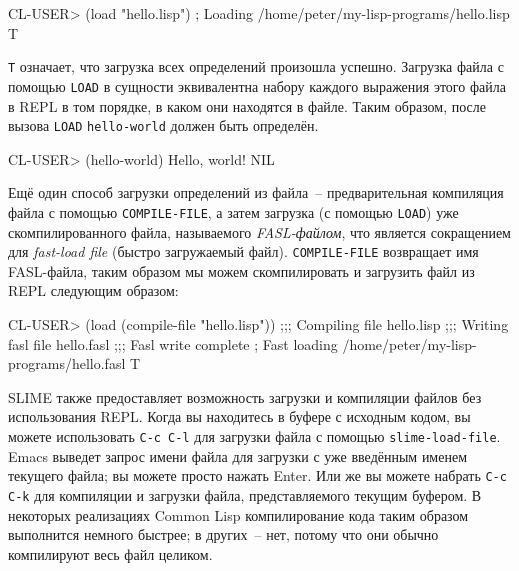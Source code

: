 \begin{myverb}
CL-USER> (load "hello.lisp")
; Loading /home/peter/my-lisp-programs/hello.lisp
T
\end{myverb}

\lstinline{T} означает, что загрузка всех определений произошла успешно. Загрузка файла с помощью \lstinline{LOAD} в сущности эквивалентна набору
каждого выражения этого файла в REPL в том порядке, в каком они находятся в файле. Таким
образом, после вызова \lstinline{LOAD} \lstinline{hello-world} должен быть определён.

\begin{myverb}
CL-USER> (hello-world)
Hello, world!
NIL
\end{myverb}

Ещё один способ загрузки определений из файла~-- предварительная компиляция файла с помощью
\lstinline{COMPILE-FILE}, а затем загрузка (с помощью \lstinline{LOAD}) уже скомпилированного файла, называемого
\emph{FASL-файлом}, что является сокращением для \emph{fast-load file} (быстро загружаемый
файл). \lstinline{COMPILE-FILE} возвращает имя FASL-файла, таким образом мы можем скомпилировать и
загрузить файл из REPL следующим образом:

\begin{myverb}
CL-USER> (load (compile-file "hello.lisp"))
;;; Compiling file hello.lisp
;;; Writing fasl file hello.fasl
;;; Fasl write complete
; Fast loading /home/peter/my-lisp-programs/hello.fasl
T
\end{myverb}

SLIME также предоставляет возможность загрузки и компиляции файлов без использования
REPL. Когда вы находитесь в буфере с исходным кодом, вы можете использовать \texttt{C-c C-l} для
загрузки файла с помощью \texttt{slime-load-file}. Emacs выведет запрос имени файла для загрузки с
уже введённым именем текущего файла; вы можете просто нажать Enter. Или же вы можете
набрать \texttt{C-c C-k} для компиляции и загрузки файла, представляемого текущим буфером. В
некоторых реализациях Common Lisp компилирование кода таким образом выполнится немного
быстрее; в других~-- нет, потому что они обычно компилируют весь файл целиком.

